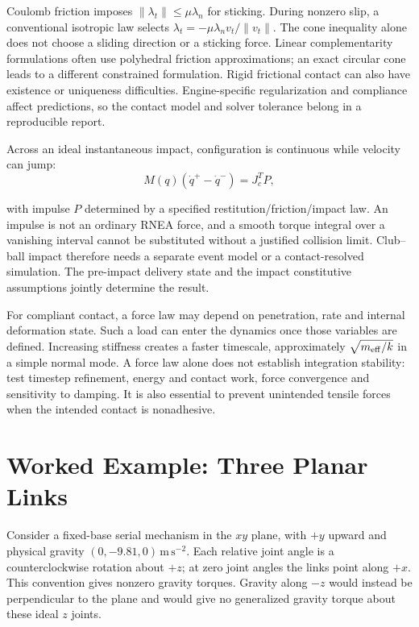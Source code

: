 Coulomb friction imposes $\|\lambda_t\|\leq\mu\lambda_n$ for sticking. During nonzero slip, a conventional isotropic law selects $\lambda_t=-\mu\lambda_n v_t/\|v_t\|$. The cone inequality alone does not choose a sliding direction or a sticking force. Linear complementarity formulations often use polyhedral friction approximations; an exact circular cone leads to a different constrained formulation. Rigid frictional contact can also have existence or uniqueness difficulties. Engine-specific regularization and compliance affect predictions, so the contact model and solver tolerance belong in a reproducible report.

Across an ideal instantaneous impact, configuration is continuous while velocity can jump:
\begin{equation}
 M(q)(\dot q^+-\dot q^-)=J_c^T P,
 \label{eq:rnea_impact_impulse}
\end{equation}

with impulse $P$ determined by a specified restitution/friction/impact law. An impulse is not an ordinary RNEA force, and a smooth torque integral over a vanishing interval cannot be substituted without a justified collision limit. Club--ball impact therefore needs a separate event model or a contact-resolved simulation. The pre-impact delivery state and the impact constitutive assumptions jointly determine the result.

For compliant contact, a force law may depend on penetration, rate and internal deformation state. Such a load can enter the dynamics once those variables are defined. Increasing stiffness creates a faster timescale, approximately $\sqrt{m_{\rm eff}/k}$ in a simple normal mode. A force law alone does not establish integration stability: test timestep refinement, energy and contact work, force convergence and sensitivity to damping. It is also essential to prevent unintended tensile forces when the intended contact is nonadhesive.

\section{Worked Example: Three Planar Links}
\label{sec:example_3link}

Consider a fixed-base serial mechanism in the $xy$ plane, with $+y$ upward and physical gravity $(0,-9.81,0)\,\mathrm{m\,s^{-2}}$. Each relative joint angle is a counterclockwise rotation about $+z$; at zero joint angles the links point along $+x$. This convention gives nonzero gravity torques. Gravity along $-z$ would instead be perpendicular to the plane and would give no generalized gravity torque about these ideal $z$ joints.

